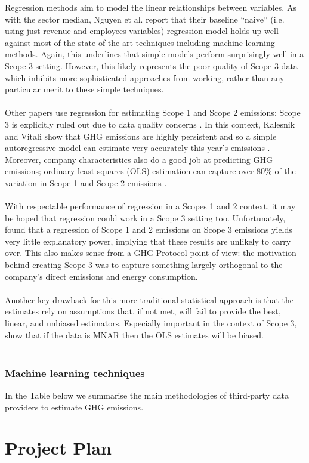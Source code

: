 \documentclass[12pt,twoside]{report}
\begin{document}
Regression methods aim to model the linear relationships between variables. As with the sector median, Nguyen et al. \cite{Nguyenetal2023} report that their baseline ``naive'' (i.e. using just revenue and employees variables) regression model holds up well against most of the state-of-the-art techniques including machine learning methods. Again, this underlines that simple models perform surprisingly well in a Scope 3 setting. However, this likely represents the poor quality of Scope 3 data which inhibits more sophisticated approaches from working, rather than any particular merit to these simple techniques.  
\\ \\
Other papers use regression for estimating Scope 1 and Scope 2 emissions: Scope 3 is explicitly ruled out due to data quality concerns \cite{KalesnikVitali2022, GoldhammerEtAl2017}. In this context, Kalesnik and Vitali show that GHG emissions are highly persistent and so a simple autoregressive model can estimate very accurately this year's emissions \cite{KalesnikVitali2022}. Moreover, company characteristics also do a good job at predicting GHG emissions; ordinary least squares (OLS) estimation can capture over 80\% of the variation in Scope 1 and Scope 2 emissions \cite{GoldhammerEtAl2017, KalesnikVitali2022}. 
\\ \\
With respectable performance of regression in a Scopes 1 and 2 context, it may be hoped that regression could work in a Scope 3 setting too. Unfortunately, \cite{ManGroup2022} found that a regression of Scope 1 and 2 emissions on Scope 3 emissions yields very little explanatory power, implying that these results are unlikely to carry over. This also makes sense from a GHG Protocol point of view: the motivation behind creating Scope 3 was to capture something largely orthogonal to the company's direct emissions and energy consumption. 
\\ \\
Another key drawback for this more traditional statistical approach is that the estimates rely on assumptions that, if not met, will fail to provide the best, linear, and unbiased estimators. Especially important in the context of Scope 3, \cite{olesiewicz2021} show that if the data is MNAR then the OLS estimates will be biased.
\\ \\

\subsection{Machine learning techniques}



In the Table below we summarise the main methodologies of third-party data providers to estimate GHG emissions. 

\chapter{Project Plan}



\end{document}
